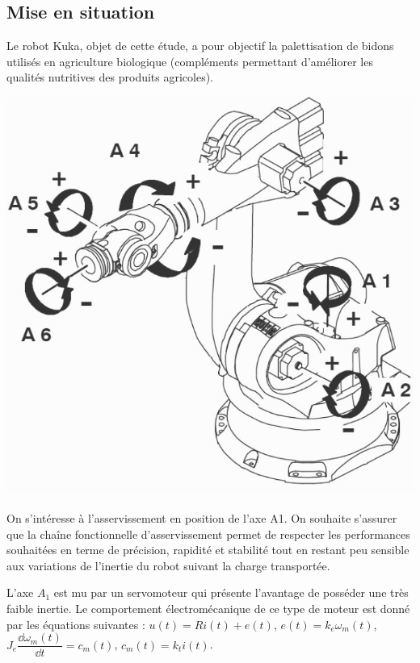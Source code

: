 \documentclass[10pt,fleqn]{article} %
\begin{document}

\vspace{4.5cm}
\pagestyle{fancy}
\thispagestyle{plain}


\def\columnseprulecolor{\color{ocre}}
\setlength{\columnseprule}{0.4pt} 

\begin{multicols}{2}
\section*{Mise en situation}
\ifprof
\else
\fi

Le robot Kuka, objet de cette étude, a pour objectif la palettisation de bidons utilisés en agriculture biologique (compléments permettant d'améliorer les qualités nutritives des produits agricoles).


\begin{center}
\includegraphics[width=.6\linewidth]{images/fig_04}
\end{center}

\begin{obj}
On s’intéresse à l’asservissement en position de l’axe A1. On souhaite s’assurer que la chaîne 
fonctionnelle d’asservissement permet de  respecter  les performances  souhaitées en  terme de 
précision, rapidité et stabilité tout en restant peu sensible aux variations de l’inertie du robot 
suivant la charge transportée. 
\end{obj}

L’axe  $A_1$  est  mu  par  un  servomoteur  qui  présente  l'avantage  de  posséder  une  très  faible inertie. Le comportement électromécanique de ce type de moteur est donné par les équations suivantes : 
$u(t) = Ri(t) + e(t)$, $e(t) =k_e \omega_m(t)$, $J_e \dfrac{\dd \omega_m(t)}{\dd t}=c_m(t)$, $c_m(t)=k_t i(t)$.


\end{multicols}
\end{document}

